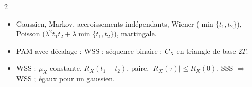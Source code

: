 \documentclass[a4paper,9pt]{extarticle}
\begin{document}
\begin{multicols}{2}
\begin{summary}
\begin{itemize}
\item Gaussien, Markov, accroissements indépendants, Wiener ($\min\{t_1,t_2\}$), Poisson
($\lambda^2t_1t_2 + \lambda\min\{t_1,t_2\}$), martingale.

\item PAM avec décalage : WSS ; séquence binaire : $C_X$ en triangle de base $2T$.

\item WSS : $\mu_X$ constante, $R_X(t_1-t_2)$, paire, $|R_X(\tau)|\le R_X(0)$. SSS $\Rightarrow$
WSS ; égaux pour un gaussien.

\end{itemize}

\end{summary}

\end{multicols}
\end{document}

